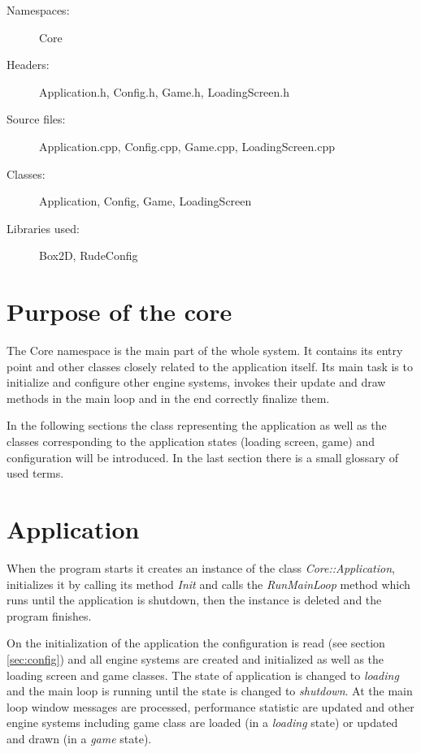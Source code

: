 \begin{description}
  \item[Namespaces:] Core
  \item[Headers:] Application.h, Config.h, Game.h, LoadingScreen.h%
  \item[Source files:] Application.cpp, Config.cpp, Game.cpp, LoadingScreen.cpp%
  \item[Classes:] Application, Config, Game, LoadingScreen%
  \item[Libraries used:] Box2D, RudeConfig
\end{description}

\section{Purpose of the core}

The Core namespace is the main part of the whole system. It contains its entry point and other classes closely related to the application itself. Its main task is to initialize and configure other engine systems, invokes their update and draw methods in the main loop and in the end correctly finalize them.

In the following sections the class representing the application as well as the classes corresponding to the application states (loading screen, game) and configuration will be introduced. In the last section there is a small glossary of used terms.

\section{Application}

When the program starts it creates an instance of the class \emph{Core::Application}, initializes it by calling its method \emph{Init} and calls the \emph{RunMainLoop} method which runs until the application is shutdown, then the instance is deleted and the program finishes.

On the initialization of the application the configuration is read (see section \ref{sec:config}) and all engine systems are created and initialized as well as the loading screen and game classes. The state of application is changed to \emph{loading} and the main loop is running until the state is changed to \emph{shutdown}. At the main loop window messages are processed, performance statistic are updated and other engine systems including game class are loaded (in a \emph{loading} state) or updated and drawn (in a \emph{game} state).

